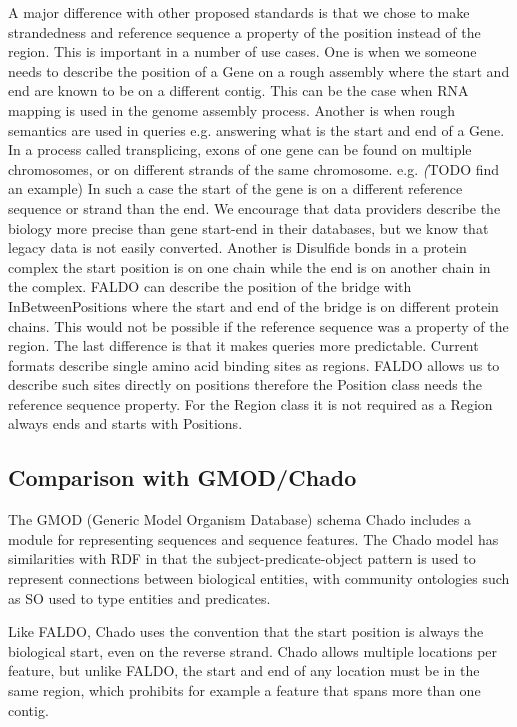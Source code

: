 A major difference with other proposed standards is that we chose to make strandedness and reference sequence a property of the position instead of the region.
This is important in a number of use cases.
One is when we someone needs to describe the position of a Gene on a rough assembly where the start and end are known to be on a different contig. 
This can be the case when RNA mapping is used in the genome assembly process.
Another is when rough semantics are used in queries e.g. answering what is the start and end of a Gene. 
In a process called transplicing, exons of one gene can be found on multiple chromosomes, or on different strands of the same chromosome. e.g. \textit(TODO find an example)
In such a case the start of the gene is on a different reference sequence or strand than the end.
We encourage that data providers describe the biology more precise than gene start-end in their databases, but we know that legacy data is not easily converted.
Another is Disulfide bonds in a protein complex the start position is on one chain while the end is on another chain in the complex.
FALDO can describe the position of the bridge with InBetweenPositions where the start and end of the bridge is on different protein chains.
This would not be possible if the reference sequence was a property of the region. 
The last difference is that it makes queries more predictable. 
Current formats describe single amino acid binding sites as regions.
FALDO allows us to describe such sites directly on positions therefore the Position class needs the reference sequence property.
For the Region class it is not required as a Region always ends and starts with Positions.

\subsection*{Comparison with GMOD/Chado}

The GMOD (Generic Model Organism Database) schema
Chado\cite{Chado2007} includes a module for representing sequences and
sequence features. The Chado model has similarities with RDF in that
the subject-predicate-object pattern is used to represent connections
between biological entities, with community ontologies such as SO used
to type entities and predicates.

Like FALDO, Chado uses the convention that the start position is
always the biological start, even on the reverse strand. Chado allows
multiple locations per feature, but unlike FALDO, the start and end of
any location must be in the same region, which prohibits for example a
feature that spans more than one contig.

